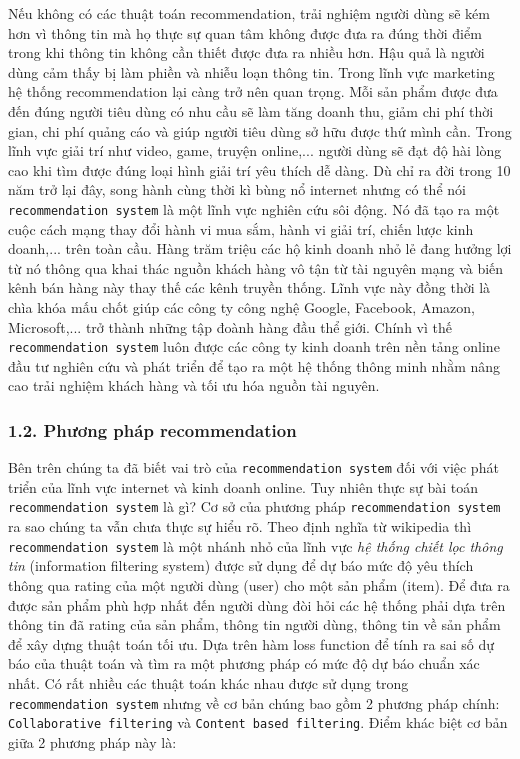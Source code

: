 \documentclass[11pt]{article}
\begin{document}
Nếu không có các thuật toán recommendation, trải nghiệm người dùng sẽ
kém hơn vì thông tin mà họ thực sự quan tâm không được đưa ra đúng thời
điểm trong khi thông tin không cần thiết được đưa ra nhiều hơn. Hậu quả
là người dùng cảm thấy bị làm phiền và nhiễu loạn thông tin. Trong lĩnh
vực marketing hệ thống recommendation lại càng trở nên quan trọng. Mỗi
sản phẩm được đưa đến đúng người tiêu dùng có nhu cầu sẽ làm tăng doanh
thu, giảm chi phí thời gian, chi phí quảng cáo và giúp người tiêu dùng
sở hữu được thứ mình cần. Trong lĩnh vực giải trí như video, game,
truyện online,... người dùng sẽ đạt độ hài lòng cao khi tìm được đúng
loại hình giải trí yêu thích dễ dàng. Dù chỉ ra đời trong 10 năm trở lại
đây, song hành cùng thời kì bùng nổ internet nhưng có thể nói
\texttt{recommendation\ system} là một lĩnh vực nghiên cứu sôi động. Nó
đã tạo ra một cuộc cách mạng thay đổi hành vi mua sắm, hành vi giải trí,
chiến lược kinh doanh,... trên toàn cầu. Hàng trăm triệu các hộ kinh
doanh nhỏ lẻ đang hưởng lợi từ nó thông qua khai thác nguồn khách hàng
vô tận từ tài nguyên mạng và biến kênh bán hàng này thay thế các kênh
truyền thống. Lĩnh vực này đồng thời là chìa khóa mấu chốt giúp các công
ty công nghệ Google, Facebook, Amazon, Microsoft,... trở thành những tập
đoành hàng đầu thể giới. Chính vì thế \texttt{recommendation\ system}
luôn được các công ty kinh doanh trên nền tảng online đầu tư nghiên cứu
và phát triển để tạo ra một hệ thống thông minh nhằm nâng cao trải
nghiệm khách hàng và tối ưu hóa nguồn tài nguyên.

\subsubsection{1.2. Phương pháp
recommendation}\label{phux1b0ux1a1ng-phuxe1p-recommendation}

Bên trên chúng ta đã biết vai trò của \texttt{recommendation\ system}
đối với việc phát triển của lĩnh vực internet và kinh doanh online. Tuy
nhiên thực sự bài toán \texttt{recommendation\ system} là gì? Cơ sở của
phương pháp \texttt{recommendation\ system} ra sao chúng ta vẫn chưa
thực sự hiểu rõ. Theo định nghĩa từ wikipedia thì
\texttt{recommendation\ system} là một nhánh nhỏ của lĩnh vực \emph{hệ
thống chiết lọc thông tin} (information filtering system) được sử dụng
để dự báo mức độ yêu thích thông qua rating của một người dùng (user)
cho một sản phẩm (item). Để đưa ra được sản phẩm phù hợp nhất đến người
dùng đòi hỏi các hệ thống phải dựa trên thông tin đã rating của sản
phẩm, thông tin người dùng, thông tin về sản phẩm để xây dựng thuật toán
tối ưu. Dựa trên hàm loss function để tính ra sai số dự báo của thuật
toán và tìm ra một phương pháp có mức độ dự báo chuẩn xác nhất. Có rất
nhiều các thuật toán khác nhau được sử dụng trong
\texttt{recommendation\ system} nhưng về cơ bản chúng bao gồm 2 phương
pháp chính: \texttt{Collaborative\ filtering} và
\texttt{Content\ based\ filtering}. Điểm khác biệt cơ bản giữa 2 phương
pháp này là:
\end{document}
